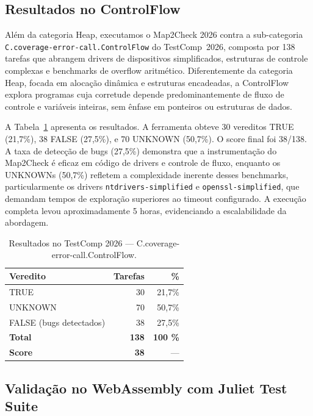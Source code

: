 \documentclass[12pt]{article}
\newcommand{\TotalCF}{138}
\newcommand{\ScoreCF}{38}
\newcommand{\CountFalseCF}{38}
\newcommand{\CountTrueCF}{30}
\newcommand{\CountUnknownCF}{70}
\newcommand{\PctTrueCF}{21,7}
\newcommand{\PctUnknownCF}{50,7}
\newcommand{\PctFalseCF}{27,5}
\begin{document}
\subsection{Resultados no ControlFlow}
\label{subsec:testcomp-cf}

Além da categoria Heap, executamos o Map2Check 2026 contra a sub-categoria \texttt{C.coverage-error-call.ControlFlow} do TestComp~2026, composta por \TotalCF{} tarefas que abrangem drivers de dispositivos simplificados, estruturas de controle complexas e benchmarks de overflow aritmético. Diferentemente da categoria Heap, focada em alocação dinâmica e estruturas encadeadas, a ControlFlow explora programas cuja corretude depende predominantemente de fluxo de controle e variáveis inteiras, sem ênfase em ponteiros ou estruturas de dados.

A Tabela~\ref{tab:testcomp-cf} apresenta os resultados. A ferramenta obteve \CountTrueCF{} vereditos TRUE (\PctTrueCF\%), \CountFalseCF{} FALSE (\PctFalseCF\%), e \CountUnknownCF{} UNKNOWN (\PctUnknownCF\%). O score final foi \ScoreCF/\TotalCF{}. A taxa de detecção de bugs (27,5\%) demonstra que a instrumentação do Map2Check é eficaz em código de drivers e controle de fluxo, enquanto os UNKNOWNs (50,7\%) refletem a complexidade inerente desses benchmarks, particularmente os drivers \texttt{ntdrivers-simplified} e \texttt{openssl-simplified}, que demandam tempos de exploração superiores ao timeout configurado. A execução completa levou aproximadamente 5 horas, evidenciando a escalabilidade da abordagem.

\begin{table}[ht]
\centering
\caption{Resultados no TestComp 2026 --- C.coverage-error-call.ControlFlow.}
\label{tab:testcomp-cf}
\begin{tabular}{@{}lrr@{}}
\toprule
Veredito & Tarefas & \% \\
\midrule
TRUE & \CountTrueCF{} & \PctTrueCF \% \\
UNKNOWN & \CountUnknownCF{} & \PctUnknownCF \% \\
FALSE (bugs detectados) & \CountFalseCF{} & \PctFalseCF \% \\
\midrule
\textbf{Total} & \textbf{\TotalCF} & \textbf{100 \%} \\
\textbf{Score} & \textbf{\ScoreCF} & --- \\
\bottomrule
\end{tabular}
\end{table}

\subsection{Validação no WebAssembly com Juliet Test Suite}
\label{subsec:wasm-juliet}
\end{document}

